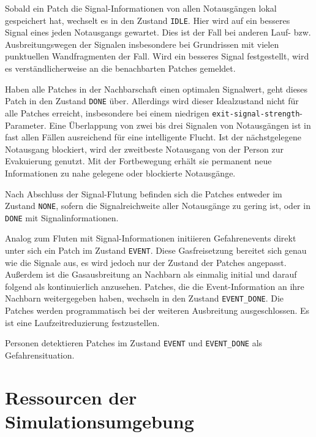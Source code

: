 Sobald ein Patch die Signal-Informationen von allen Notausgängen lokal gespeichert hat, wechselt es in den Zustand \verb|IDLE|. Hier wird auf ein besseres Signal eines jeden Notausgangs gewartet. Dies ist der Fall bei anderen Lauf- bzw. Ausbreitungswegen der Signalen insbesondere bei Grundrissen mit vielen punktuellen Wandfragmenten der Fall. Wird ein besseres Signal festgestellt, wird es verständlicherweise an die benachbarten Patches gemeldet.

Haben alle Patches in der Nachbarschaft einen optimalen Signalwert, geht dieses Patch in den Zustand \verb|DONE| über. Allerdings wird dieser Idealzustand nicht für alle Patches erreicht, insbesondere bei einem niedrigen \verb|exit-signal-strength|-Parameter. Eine Überlappung von zwei bis drei Signalen von Notausgängen ist in fast allen Fällen ausreichend für eine intelligente Flucht. Ist der nächstgelegene Notausgang blockiert, wird der zweitbeste Notausgang von der Person zur Evakuierung genutzt. Mit der Fortbewegung erhält sie permanent neue Informationen zu nahe gelegene oder blockierte Notausgänge.

Nach Abschluss der Signal-Flutung befinden sich die Patches entweder im Zustand \verb|NONE|, sofern die Signalreichweite aller Notausgänge zu gering ist, oder in \verb|DONE| mit Signalinformationen.

Analog zum Fluten mit Signal-Informationen initiieren Gefahrenevents direkt unter sich ein Patch im Zustand \verb|EVENT|. Diese Gasfreisetzung bereitet sich genau wie die Signale aus, es wird jedoch nur der Zustand der Patches angepasst. Außerdem ist die Gasausbreitung an Nachbarn als einmalig initial und darauf folgend als kontinuierlich anzusehen. Patches, die die Event-Information an ihre Nachbarn weitergegeben haben, wechseln in den Zustand \verb|EVENT_DONE|. Die Patches werden programmatisch bei der weiteren Ausbreitung ausgeschlossen. Es ist eine Laufzeitreduzierung festzustellen.

Personen detektieren Patches im Zustand \verb|EVENT| und \verb|EVENT_DONE| als Gefahrensituation.


\section{Ressourcen der Simulationsumgebung}
\label{sec:ressourcen}

